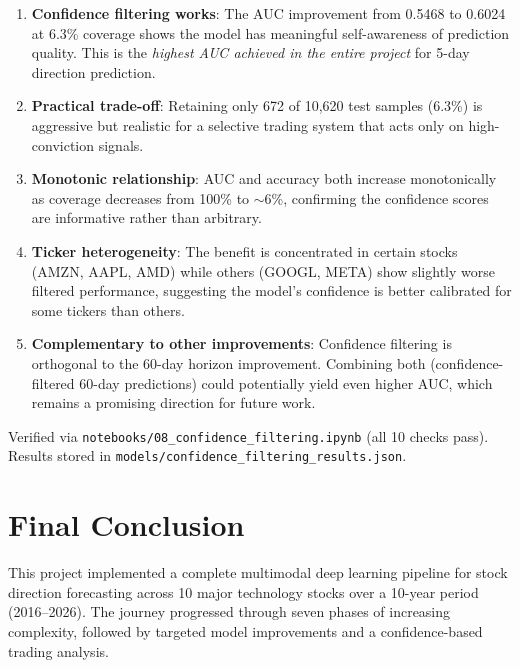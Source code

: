 \documentclass[12pt,a4paper]{article}
\begin{document}
\begin{enumerate}
    \item \textbf{Confidence filtering works}: The AUC improvement from 0.5468 to 0.6024 at 6.3\% coverage shows the model has meaningful self-awareness of prediction quality. This is the \emph{highest AUC achieved in the entire project} for 5-day direction prediction.
    
    \item \textbf{Practical trade-off}: Retaining only 672 of 10,620 test samples (6.3\%) is aggressive but realistic for a selective trading system that acts only on high-conviction signals.
    
    \item \textbf{Monotonic relationship}: AUC and accuracy both increase monotonically as coverage decreases from 100\% to $\sim$6\%, confirming the confidence scores are informative rather than arbitrary.
    
    \item \textbf{Ticker heterogeneity}: The benefit is concentrated in certain stocks (AMZN, AAPL, AMD) while others (GOOGL, META) show slightly worse filtered performance, suggesting the model's confidence is better calibrated for some tickers than others.
    
    \item \textbf{Complementary to other improvements}: Confidence filtering is orthogonal to the 60-day horizon improvement. Combining both (confidence-filtered 60-day predictions) could potentially yield even higher AUC, which remains a promising direction for future work.
\end{enumerate}

\noindent Verified via \texttt{notebooks/08\_confidence\_filtering.ipynb} (all 10 checks pass). Results stored in \texttt{models/confidence\_filtering\_results.json}.

\section{Final Conclusion}
\label{sec:final_conclusion}

This project implemented a complete multimodal deep learning pipeline for stock direction forecasting across 10 major technology stocks over a 10-year period (2016--2026). The journey progressed through seven phases of increasing complexity, followed by targeted model improvements and a confidence-based trading analysis.
\end{document}
